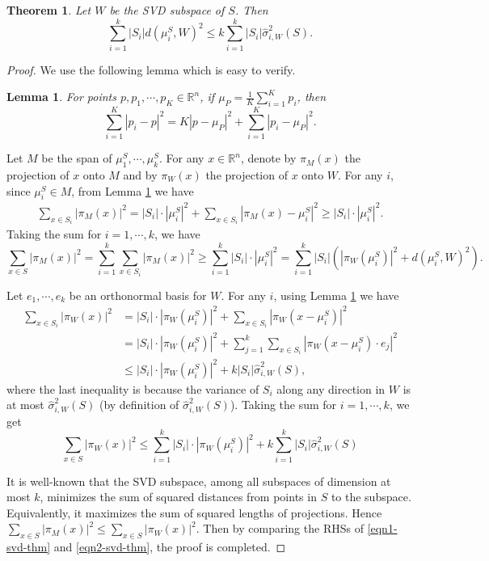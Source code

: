 \documentclass[11pt,letter]{article}
\newtheorem{theorem}{Theorem}
\newtheorem{lemma}{Lemma}
\begin{document}
\begin{theorem}\label{thm:spectral-svd}
Let $W$ be the SVD subspace of $S$. Then
\[
\sum_{i=1}^k |S_i| d(\mu_i^S, W)^2 \le k \sum_{i=1}^k |S_i| \hat \sigma_{i, W}^2(S).
\]
\end{theorem}
\begin{proof}
We use the following lemma which is easy to verify.
\begin{lemma}\label{lem:pythagorean}
For points $p, p_1, \cdots, p_K \in \mathbb R^n$, if $\mu_{P} = \frac1K\sum_{i=1}^K p_i$, then
\[
\sum_{i=1}^K |p_i - p|^2 = K|p - \mu_P|^2 + \sum_{i=1}^K |p_i - \mu_P|^2.
\]
\end{lemma}

Let $M$ be the span of $\mu_1^S, \cdots, \mu_k^S$. For any $x\in \mathbb R^n$, denote by $\pi_M(x)$ the projection of $x$ onto $M$ and by $\pi_W(x)$ the projection of $x$ onto $W$. For any $i$, since $\mu_i^S \in M$, from Lemma \ref{lem:pythagorean} we have
\begin{equation*}
\begin{aligned}
\sum_{x\in S_i} |\pi_M(x)|^2 = |S_i|\cdot|\mu_i^S|^2 + \sum_{x\in S_i} |\pi_M(x) - \mu_i^S|^2 
\ge |S_i|\cdot|\mu_i^S|^2.
\end{aligned}
\end{equation*}
Taking the sum for $i=1, \cdots, k$, we have
\begin{equation} \label{eqn1-svd-thm}
\sum_{x\in S}|\pi_M(x)|^2 = \sum_{i=1}^k \sum_{x\in S_i} |\pi_M(x)|^2
\ge \sum_{i=1}^k |S_i|\cdot|\mu_i^S|^2
= \sum_{i=1}^k |S_i| \left( |\pi_W(\mu_i^S)|^2 + d(\mu_i^S, W)^2 \right).
\end{equation}

Let $e_1, \cdots, e_k$ be an orthonormal basis for $W$. For any $i$, using Lemma \ref{lem:pythagorean} we have
\begin{equation*}
\begin{aligned}
\sum_{x\in S_i} |\pi_W(x)|^2 &= |S_i|\cdot|\pi_W(\mu_i^S)|^2 + \sum_{x\in S_i} |\pi_W(x - \mu_i^S)|^2\\
&= |S_i|\cdot|\pi_W(\mu_i^S)|^2 + \sum_{j=1}^k \sum_{x\in S_i} |\pi_W(x - \mu_i^S)\cdot e_j|^2\\
&\le |S_i|\cdot|\pi_W(\mu_i^S)|^2 + k|S_i| \hat \sigma_{i, W}^2(S),
\end{aligned}
\end{equation*}
where the last inequality is because the variance of $S_i$ along any direction in $W$ is at most $\hat \sigma_{i, W}^2(S)$ (by definition of $\hat \sigma_{i, W}^2(S)$). Taking the sum for $i=1,\cdots,k$, we get
\begin{equation} \label{eqn2-svd-thm}
\sum_{x\in S} |\pi_W(x)|^2 \le \sum_{i=1}^k |S_i|\cdot|\pi_W(\mu_i^S)|^2 + k\sum_{i=1}^k |S_i| \hat \sigma_{i, W}^2(S)
\end{equation}

It is well-known that the SVD subspace, among all subspaces of dimension at most $k$, minimizes the sum of squared distances from points in $S$ to the subspace. Equivalently, it maximizes the sum of squared lengths of projections. Hence $\sum_{x\in S}|\pi_M(x)|^2 \le \sum_{x\in S}|\pi_W(x)|^2$. Then by comparing the RHSs of \eqref{eqn1-svd-thm} and \eqref{eqn2-svd-thm}, the proof is completed.
\end{proof}
\end{document}
